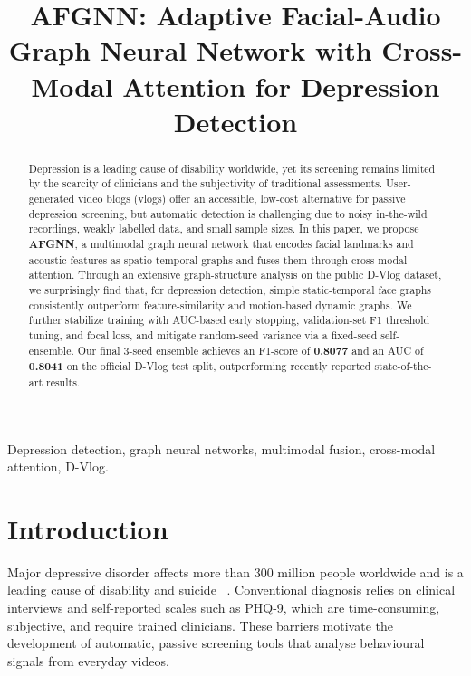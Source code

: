 \documentclass[conference]{IEEEtran}
\begin{document}
\title{AFGNN: Adaptive Facial-Audio Graph Neural Network with Cross-Modal Attention for Depression Detection}

\author{
}

\maketitle

\begin{abstract}
Depression is a leading cause of disability worldwide, yet its screening remains limited by the scarcity of clinicians and the subjectivity of traditional assessments.
User-generated video blogs (vlogs) offer an accessible, low-cost alternative for passive depression screening, but automatic detection is challenging due to noisy in-the-wild recordings, weakly labelled data, and small sample sizes.
In this paper, we propose \textbf{AFGNN}, a multimodal graph neural network that encodes facial landmarks and acoustic features as spatio-temporal graphs and fuses them through cross-modal attention.
Through an extensive graph-structure analysis on the public D-Vlog dataset, we surprisingly find that, for depression detection, simple static-temporal face graphs consistently outperform feature-similarity and motion-based dynamic graphs.
We further stabilize training with AUC-based early stopping, validation-set F1 threshold tuning, and focal loss, and mitigate random-seed variance via a fixed-seed self-ensemble.
Our final 3-seed ensemble achieves an F1-score of \textbf{0.8077} and an AUC of \textbf{0.8041} on the official D-Vlog test split, outperforming recently reported state-of-the-art results.
\end{abstract}

\begin{IEEEkeywords}
Depression detection, graph neural networks, multimodal fusion, cross-modal attention, D-Vlog.
\end{IEEEkeywords}

\section{Introduction}
\label{sec:intro}

Major depressive disorder affects more than 300 million people worldwide and is a leading cause of disability and suicide~
\cite{yoon2022dvlog}.
Conventional diagnosis relies on clinical interviews and self-reported scales such as PHQ-9, which are time-consuming, subjective, and require trained clinicians.
These barriers motivate the development of automatic, passive screening tools that analyse behavioural signals from everyday videos.
\end{document}

